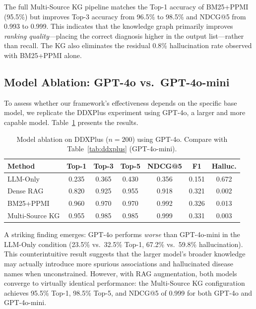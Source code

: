 \documentclass[review]{elsarticle}
\begin{document}
The full Multi-Source KG pipeline matches the Top-1 accuracy of BM25+PPMI (95.5\%) but improves Top-3 accuracy from 96.5\% to 98.5\% and NDCG@5 from 0.993 to 0.999. This indicates that the knowledge graph primarily improves \emph{ranking quality}---placing the correct diagnosis higher in the output list---rather than recall. The KG also eliminates the residual 0.8\% hallucination rate observed with BM25+PPMI alone.

\subsection{Model Ablation: GPT-4o vs.\ GPT-4o-mini}
\label{sec:model_ablation}

To assess whether our framework's effectiveness depends on the specific base model, we replicate the DDXPlus experiment using GPT-4o, a larger and more capable model. Table~\ref{tab:gpt4o} presents the results.

\begin{table}[t]
\centering
\caption{Model ablation on DDXPlus ($n{=}200$) using GPT-4o. Compare with Table~\ref{tab:ddxplus} (GPT-4o-mini).}
\label{tab:gpt4o}
\begin{tabular}{lcccccc}
\toprule
\textbf{Method} & \textbf{Top-1} & \textbf{Top-3} & \textbf{Top-5} & \textbf{NDCG@5} & \textbf{F1} & \textbf{Halluc.} \\
\midrule
LLM-Only       & 0.235 & 0.365 & 0.430 & 0.356 & 0.151 & 0.672 \\
Dense RAG       & 0.820 & 0.925 & 0.955 & 0.918 & 0.321 & 0.002 \\
BM25+PPMI       & 0.960 & 0.970 & 0.970 & 0.992 & 0.326 & 0.013 \\
Multi-Source KG & 0.955 & 0.985 & 0.985 & 0.999 & 0.331 & 0.003 \\
\bottomrule
\end{tabular}
\end{table}

A striking finding emerges: GPT-4o performs \emph{worse} than GPT-4o-mini in the LLM-Only condition (23.5\% vs.\ 32.5\% Top-1, 67.2\% vs.\ 59.8\% hallucination). This counterintuitive result suggests that the larger model's broader knowledge may actually introduce more spurious associations and hallucinated disease names when unconstrained. However, with RAG augmentation, both models converge to virtually identical performance: the Multi-Source KG configuration achieves 95.5\% Top-1, 98.5\% Top-5, and NDCG@5 of 0.999 for both GPT-4o and GPT-4o-mini.
\end{document}
